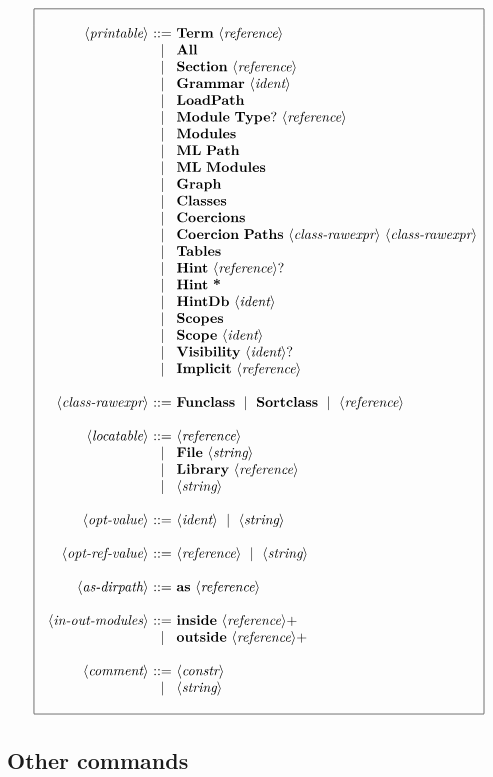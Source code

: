\documentclass{article}
\makeatletter
\def\NT#1{\langle\textit{#1}\rangle}
\def\TERM#1{{\bf\textrm{\bf #1}}}
\def\KWD#1{\TERM{#1}}
\def\PLUS#1{#1+}
\def\OPT#1{#1?}
\newenvironment{cadre}
        {\begin{array}{|c|}\hline\\}
        {\\\\\hline\end{array}}
\newenvironment{rulebox}
        {$$\begin{cadre}\begin{array}{r@{~}c@{~}l@{}l@{}r}}
        {\end{array}\end{cadre}$$}
\def\DEFNT#1{\NT{#1} & ::= &}
\def\SEPDEF{\\\\}
\def\nlsep{\\&|&}
\newenvironment{rules}
        {\begin{center}\begin{rulebox}}
        {\end{rulebox}\end{center}}
\makeatother
\begin{document}
\begin{rules}
\DEFNT{printable}
       \TERM{Term}~\NT{reference}
\nlsep \TERM{All}
\nlsep \TERM{Section}~\NT{reference}
\nlsep \TERM{Grammar}~\NT{ident}
\nlsep \TERM{LoadPath}
\nlsep \TERM{Module}~\OPT{\KWD{Type}}~\NT{reference}
\nlsep \TERM{Modules}
\nlsep \TERM{ML}~\TERM{Path}
\nlsep \TERM{ML}~\TERM{Modules}
\nlsep \TERM{Graph}
\nlsep \TERM{Classes}
\nlsep \TERM{Coercions}
\nlsep \TERM{Coercion}~\TERM{Paths}~\NT{class-rawexpr}~\NT{class-rawexpr}
\nlsep \TERM{Tables}
\nlsep \TERM{Hint}~\OPT{\NT{reference}}
\nlsep \TERM{Hint}~\TERM{*}
\nlsep \TERM{HintDb}~\NT{ident}
\nlsep \TERM{Scopes}
\nlsep \TERM{Scope}~\NT{ident}
\nlsep \TERM{Visibility}~\OPT{\NT{ident}}
\nlsep \TERM{Implicit}~\NT{reference}
\SEPDEF
\DEFNT{class-rawexpr}
       \TERM{Funclass}~\mid~\TERM{Sortclass}~\mid~\NT{reference}
\SEPDEF
\DEFNT{locatable}
       \NT{reference}
\nlsep \TERM{File}~\NT{string}
\nlsep \TERM{Library}~\NT{reference}
\nlsep \NT{string}
\SEPDEF
\DEFNT{opt-value}
       \NT{ident} ~\mid~ \NT{string}
\SEPDEF
\DEFNT{opt-ref-value}
       \NT{reference} ~\mid~ \NT{string}
\SEPDEF
\DEFNT{as-dirpath}
       \KWD{as}~\NT{reference}
\SEPDEF
\DEFNT{in-out-modules}
       \TERM{inside}~\PLUS{\NT{reference}}
\nlsep \TERM{outside}~\PLUS{\NT{reference}}
\SEPDEF
\DEFNT{comment}
       \NT{constr}
\nlsep \NT{string}
\end{rules}

\subsection{Other commands}
\end{document}
